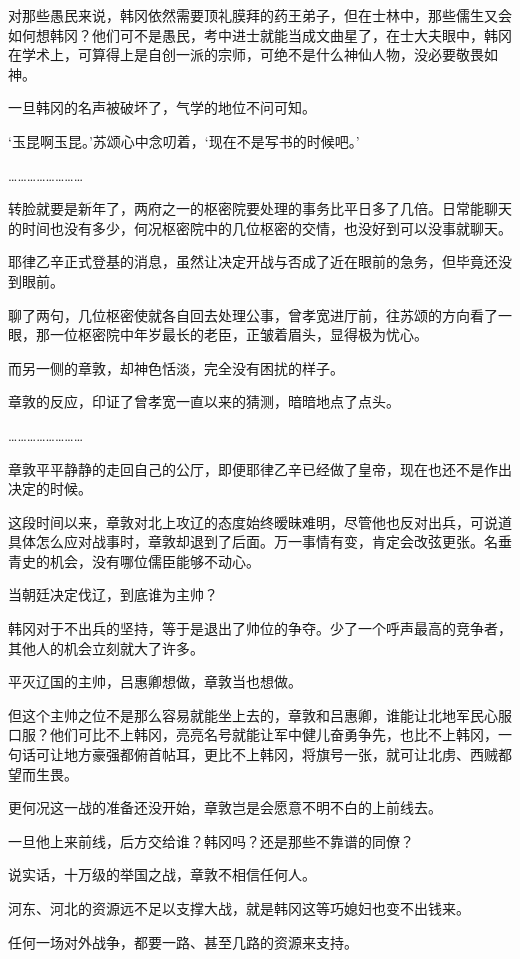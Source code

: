 对那些愚民来说，韩冈依然需要顶礼膜拜的药王弟子，但在士林中，那些儒生又会如何想韩冈？他们可不是愚民，考中进士就能当成文曲星了，在士大夫眼中，韩冈在学术上，可算得上是自创一派的宗师，可绝不是什么神仙人物，没必要敬畏如神。

一旦韩冈的名声被破坏了，气学的地位不问可知。

‘玉昆啊玉昆。’苏颂心中念叨着，‘现在不是写书的时候吧。’

……………………

转脸就要是新年了，两府之一的枢密院要处理的事务比平日多了几倍。日常能聊天的时间也没有多少，何况枢密院中的几位枢密的交情，也没好到可以没事就聊天。

耶律乙辛正式登基的消息，虽然让决定开战与否成了近在眼前的急务，但毕竟还没到眼前。

聊了两句，几位枢密使就各自回去处理公事，曾孝宽进厅前，往苏颂的方向看了一眼，那一位枢密院中年岁最长的老臣，正皱着眉头，显得极为忧心。

而另一侧的章敦，却神色恬淡，完全没有困扰的样子。

章敦的反应，印证了曾孝宽一直以来的猜测，暗暗地点了点头。

……………………

章敦平平静静的走回自己的公厅，即便耶律乙辛已经做了皇帝，现在也还不是作出决定的时候。

这段时间以来，章敦对北上攻辽的态度始终暧昧难明，尽管他也反对出兵，可说道具体怎么应对战事时，章敦却退到了后面。万一事情有变，肯定会改弦更张。名垂青史的机会，没有哪位儒臣能够不动心。

当朝廷决定伐辽，到底谁为主帅？

韩冈对于不出兵的坚持，等于是退出了帅位的争夺。少了一个呼声最高的竞争者，其他人的机会立刻就大了许多。

平灭辽国的主帅，吕惠卿想做，章敦当也想做。

但这个主帅之位不是那么容易就能坐上去的，章敦和吕惠卿，谁能让北地军民心服口服？他们可比不上韩冈，亮亮名号就能让军中健儿奋勇争先，也比不上韩冈，一句话可让地方豪强都俯首帖耳，更比不上韩冈，将旗号一张，就可让北虏、西贼都望而生畏。

更何况这一战的准备还没开始，章敦岂是会愿意不明不白的上前线去。

一旦他上来前线，后方交给谁？韩冈吗？还是那些不靠谱的同僚？

说实话，十万级的举国之战，章敦不相信任何人。

河东、河北的资源远不足以支撑大战，就是韩冈这等巧媳妇也变不出钱来。

任何一场对外战争，都要一路、甚至几路的资源来支持。

